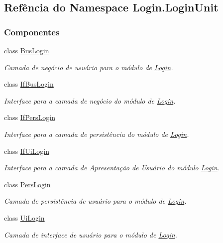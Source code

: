\hypertarget{namespaceLogin_1_1LoginUnit}{}\subsection{Refência do Namespace Login.\+Login\+Unit}
\label{namespaceLogin_1_1LoginUnit}
\subsubsection*{Componentes}
\begin{DoxyCompactItemize}
\item 
class \hyperlink{classLogin_1_1LoginUnit_1_1BusLogin}{Bus\+Login}
\begin{DoxyCompactList}\small\item\em Camada de negócio de usuário para o módulo de \hyperlink{namespaceLogin}{Login}. \end{DoxyCompactList}\item 
class \hyperlink{classLogin_1_1LoginUnit_1_1IfBusLogin}{If\+Bus\+Login}
\begin{DoxyCompactList}\small\item\em Interface para a camada de negócio do módulo de \hyperlink{namespaceLogin}{Login}. \end{DoxyCompactList}\item 
class \hyperlink{classLogin_1_1LoginUnit_1_1IfPersLogin}{If\+Pers\+Login}
\begin{DoxyCompactList}\small\item\em Interface para a camada de persistência do módulo de \hyperlink{namespaceLogin}{Login}. \end{DoxyCompactList}\item 
class \hyperlink{classLogin_1_1LoginUnit_1_1IfUiLogin}{If\+Ui\+Login}
\begin{DoxyCompactList}\small\item\em Interface para a camada de Apresentação de Usuário do módulo \hyperlink{namespaceLogin}{Login}. \end{DoxyCompactList}\item 
class \hyperlink{classLogin_1_1LoginUnit_1_1PersLogin}{Pers\+Login}
\begin{DoxyCompactList}\small\item\em Camada de persistência de usuário para o módulo de \hyperlink{namespaceLogin}{Login}. \end{DoxyCompactList}\item 
class \hyperlink{classLogin_1_1LoginUnit_1_1UiLogin}{Ui\+Login}
\begin{DoxyCompactList}\small\item\em Camada de interface de usuário para o módulo de \hyperlink{namespaceLogin}{Login}. \end{DoxyCompactList}\end{DoxyCompactItemize}

